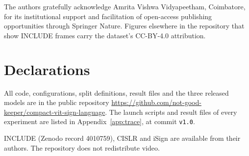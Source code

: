 \documentclass[pdflatex,sn-mathphys-num,twocolumn]{sn-jnl}
\theoremstyle{thmstyleone}%
\begin{document}
\backmatter

The authors gratefully acknowledge Amrita Vishwa Vidyapeetham, Coimbatore, for its institutional support and facilitation of open-access publishing opportunities through Springer Nature. Figures elsewhere in the repository that show INCLUDE frames carry the dataset's CC-BY-4.0 attribution.

\section*{Declarations}

All code, configurations, split definitions, result files and the three released models are in the public repository \url{https://github.com/not-good-keeper/compact-vit-sign-language}. The launch scripts and result files of every experiment are listed in Appendix~\ref{app:trace}, at commit \texttt{v1.0}.

INCLUDE (Zenodo record 4010759), CISLR and iSign are available from their authors. The repository does not redistribute video.
\end{document}

